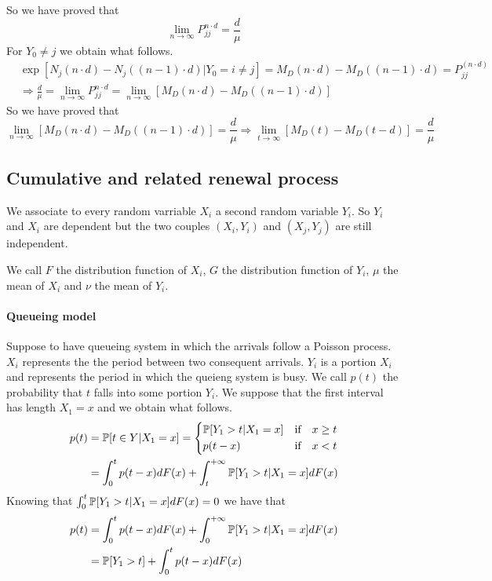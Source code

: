 	So we have proved that
	\begin{equation}
		\lim_{n \to \infty} P_{jj}^{n \cdot d}=\frac{d}{\mu}
	\end{equation}
	For $Y_0 \neq j$ we obtain what follows.
	\begin{align*}
		& \exp[N_j(n \cdot d)-N_j((n-1) \cdot d)|Y_0=i \neq j]=M_D(n \cdot d)-M_D((n-1) \cdot d)=P_{jj}^{(n \cdot d)}
		\\ & \Rightarrow \frac{d}{\mu}=\lim_{n \to \infty} P_{jj}^{n \cdot d} = \lim_{n \to \infty} [M_D(n \cdot d)-M_D((n-1) \cdot d)]
	\end{align*}
	So we have proved that
	\begin{equation}
		\lim_{n \to \infty} [M_D(n \cdot d)-M_D((n-1) \cdot d)]=\frac{d}{\mu} \Rightarrow \lim_{t \to \infty }[M_D(t)-M_D(t-d)]=\frac{d}{\mu}
	\end{equation}

\subsection{Cumulative and related renewal process}
	We associate to every random varriable $X_i$ a second random variable $Y_i$. So $Y_i$ and $X_i$ are dependent but the two couples $(X_i,Y_i)$ and $(X_j,Y_j)$ are still independent.

	We call $F$ the distribution function of $X_i$, $G$ the distribution function of $Y_i$, $\mu$ the mean of $X_i$ and $\nu$ the mean of $Y_i$.

	\paragraph{Queueing model}
	Suppose to have queueing system in which the arrivals follow a Poisson process. $X_i$ represents the the period between two consequent arrivals. $Y_i$ is a portion $X_i$ and represents the period in which the queieng system is busy. We call $p(t)$ the probability that $t$ falls into some portion $Y_i$. We suppose that the first interval has length $X_1=x$ and we obtain what follows.
	\begin{align*}
		p(t) & =\mathbb{P}[t \in Y |X_1 = x]=\begin{dcases}
			\mathbb{P}[Y_1>t|X_1=x] & \text{if} \quad x \geq t
			\\ p(t-x) & \text{if} \quad x<t
		\end{dcases}
		\\ & = \int_0^t p(t-x)dF(x)+\int_t^{+\infty}\mathbb{P}[Y_1>t|X_1=x]dF(x)
	\end{align*}
	Knowing that $\int_0^{t}\mathbb{P}[Y_1>t|X_1=x]dF(x)=0$ we have that
	\begin{align*}
		p(t) & = \int_0^t p(t-x)dF(x)+\int_0^{+\infty}\mathbb{P}[Y_1>t|X_1=x]dF(x)
		\\ & = \mathbb{P}[Y_1>t]+\int_0^t p(t-x)dF(x)
	\end{align*}


